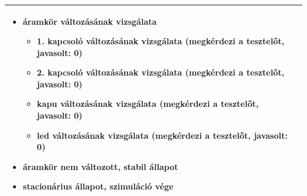 \begin{longtable}{| l | p{12cm} |}
\begin{itemize}
\renewcommand{\labelitemi}{--}
\renewcommand{\labelitemii}{*}
\setlength{\itemsep}{0cm}%
\setlength{\parskip}{0cm}%
\setlength{\itemindent}{0em}%
\item áramkör változásának vizsgálata
\begin{itemize}
\setlength{\itemsep}{0cm}%
\setlength{\parskip}{0cm}%
\setlength{\itemindent}{0em}%
	\item 1. kapcsoló változásának vizsgálata (\textbf{megkérdezi a tesztelőt}, javasolt: 0)
	\item 2. kapcsoló változásának vizsgálata (\textbf{megkérdezi a tesztelőt}, javasolt: 0)
	\item kapu változásának vizsgálata (\textbf{megkérdezi a tesztelőt}, javasolt: 0)
	\item led változásának vizsgálata (\textbf{megkérdezi a tesztelőt}, javasolt: 0)
\end{itemize}
\item áramkör nem változott, stabil állapot
\item stacionárius állapot, szimuláció vége
\end{itemize}
\vspace{-15pt}\tabularnewline
	\hline
	\end{longtable}

\newpage

